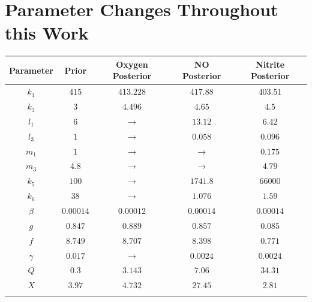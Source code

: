 \section{Parameter Changes Throughout this Work}
\begin{table}[tbp]
\begin{center}
\begin{tabular}{ccccc}
\toprule
\textbf{Parameter} & \textbf{Prior} & \textbf{Oxygen Posterior} & \textbf{NO Posterior} & \textbf{Nitrite Posterior}
\tabularnewline
\midrule
$k_1$ & $415$ & $413.228$ & $417.88$ & $403.51$
\tabularnewline\noalign{\smallskip}\hline\noalign{\smallskip}

$k_3$ & $3$ & $4.496$ & $4.65$ & $4.5$
\tabularnewline\noalign{\smallskip}\hline\noalign{\smallskip}

$l_1$ & $6$ & $\rightarrow$ & $13.12$ & $6.42$
\tabularnewline\noalign{\smallskip}\hline\noalign{\smallskip}

$l_3$ & $1$ & $\rightarrow$ & $0.058$ & $0.096$
\tabularnewline\noalign{\smallskip}\hline\noalign{\smallskip}

$m_1$ & $1$ & $\rightarrow$ & $\rightarrow$ & $0.175$
\tabularnewline\noalign{\smallskip}\hline\noalign{\smallskip}

$m_3$ & $4.8$ & $\rightarrow$ & $\rightarrow$ & $4.79$
\tabularnewline\noalign{\smallskip}\hline\noalign{\smallskip}

$k_5$ & $100$ & $\rightarrow$ & $1741.8$ & $66000$
\tabularnewline\noalign{\smallskip}\hline\noalign{\smallskip}

$k_6$ & $38$ & $\rightarrow$ & $1.076$ & $1.59$
\tabularnewline\noalign{\smallskip}\hline\noalign{\smallskip}

$\beta$ & $0.00014$ & $0.00012$ & $0.00014$ & $0.00014$
\tabularnewline\noalign{\smallskip}\hline\noalign{\smallskip}

$g$ & $0.847$ & $0.889$ & $0.857$ & $0.085$
\tabularnewline\noalign{\smallskip}\hline\noalign{\smallskip}

$f$ & $8.749$ & $8.707$ & $8.398$ & $0.771$
\tabularnewline\noalign{\smallskip}\hline\noalign{\smallskip}

$\gamma$ & $0.017$ & $\rightarrow$ & $0.0024$ & $0.0024$
\tabularnewline\noalign{\smallskip}\hline\noalign{\smallskip}

$Q$ & $0.3$ & $3.143$ & $7.06$ & $34.31$
\tabularnewline\noalign{\smallskip}\hline\noalign{\smallskip}

$X$ & $3.97$ & $4.732$ & $27.45$ & $2.81$
\tabularnewline\noalign{\smallskip}\hline\noalign{\smallskip}


\end{tabular}
\end{center}
\end{table}

